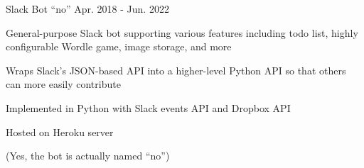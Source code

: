 

\begin{cventries}

  \cventry
    {} %
    {Slack Bot ``no''} %
    {} %
    {Apr. 2018 - Jun. 2022} %
    {
      \begin{cvitems} %
        \item {General-purpose Slack bot supporting various features including todo list, highly configurable Wordle game, image storage, and more}
        \item {Wraps Slack's JSON-based API into a higher-level Python API so that others can more easily contribute}
        \item {Implemented in Python with Slack events API and Dropbox API}
        \item {Hosted on Heroku server}
        \item {(Yes, the bot is actually named ``no'')}
      \end{cvitems}
    }

\end{cventries}
